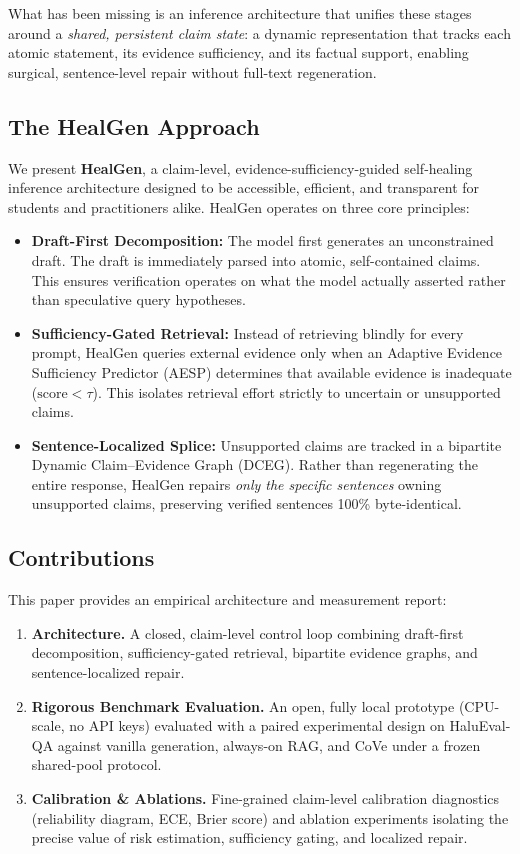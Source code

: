 What has been missing is an inference architecture that unifies these stages around a \emph{shared, persistent claim state}: a dynamic representation that tracks each atomic statement, its evidence sufficiency, and its factual support, enabling surgical, sentence-level repair without full-text regeneration.

\subsection{The HealGen Approach}
We present \textbf{HealGen}, a claim-level, evidence-sufficiency-guided self-healing inference architecture designed to be accessible, efficient, and transparent for students and practitioners alike. HealGen operates on three core principles:
\begin{itemize}
  \item \textbf{Draft-First Decomposition:} The model first generates an unconstrained draft. The draft is immediately parsed into atomic, self-contained claims. This ensures verification operates on what the model actually asserted rather than speculative query hypotheses.
  \item \textbf{Sufficiency-Gated Retrieval:} Instead of retrieving blindly for every prompt, HealGen queries external evidence only when an Adaptive Evidence Sufficiency Predictor (AESP) determines that available evidence is inadequate ($\mathrm{score} < \tau$). This isolates retrieval effort strictly to uncertain or unsupported claims.
  \item \textbf{Sentence-Localized Splice:} Unsupported claims are tracked in a bipartite Dynamic Claim--Evidence Graph (DCEG). Rather than regenerating the entire response, HealGen repairs \emph{only the specific sentences} owning unsupported claims, preserving verified sentences 100\% byte-identical.
\end{itemize}

\subsection{Contributions}
This paper provides an empirical architecture and measurement report:
\begin{enumerate}
  \item \textbf{Architecture.} A closed, claim-level control loop combining draft-first decomposition, sufficiency-gated retrieval, bipartite evidence graphs, and sentence-localized repair.
  \item \textbf{Rigorous Benchmark Evaluation.} An open, fully local prototype (CPU-scale, no API keys) evaluated with a paired experimental design on HaluEval-QA against vanilla generation, always-on RAG, and CoVe under a frozen shared-pool protocol.
  \item \textbf{Calibration \& Ablations.} Fine-grained claim-level calibration diagnostics (reliability diagram, ECE, Brier score) and ablation experiments isolating the precise value of risk estimation, sufficiency gating, and localized repair.
\end{enumerate}

